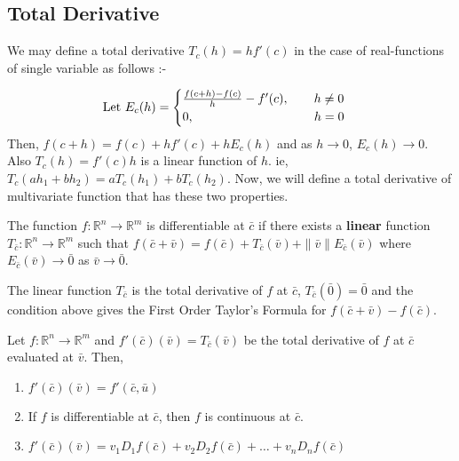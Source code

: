 \subsection{Total Derivative}
We may define a total derivative \( T_c(h) = hf'(c) \) in the case of real-functions of single variable as follows :-

\[ \text{Let }E_c(h) = \begin{cases} \frac{f(c+h)-f(c)}{h} - f'(c),\qquad h \ne 0 \\ 0,\hspace{3.4cm} h = 0 \end{cases} \]
Then, \( f(c+h) = f(c) + hf'(c) + hE_c(h) \) and as \( h \to 0 \), \( E_c(h) \to 0\).
Also \( T_c(h) = f'(c)h \) is a linear function of $h$.
ie, \( T_c(ah_1+bh_2) = aT_c(h_1)+bT_c(h_2) \).
Now, we will define a total derivative of multivariate function that has these two properties.

\begin{definition}
	The function \( f: \mathbb{R}^n \to \mathbb{R}^m \) is differentiable at $\bar{c}$ if there exists a \textbf{linear} function \( T_{\bar{c}} : \mathbb{R}^n \to \mathbb{R}^m \) such that \( f(\bar{c}+\bar{v}) = f(\bar{c}) + T_{\bar{c}}(\bar{v}) + \|\bar{v}\| E_{\bar{c}}(\bar{v}) \) where \( E_{\bar{c}}(\bar{v}) \to \bar{0} \) as \( \bar{v} \to \bar{0} \).
\end{definition}

The linear function $T_{\bar{c}}$ is the total derivative of $f$ at $\bar{c}$, \( T_{\bar{c}}(\bar{0}) = \bar{0} \) and the condition above gives the First Order Taylor's Formula for \( f(\bar{c}+\bar{v})-f(\bar{c}) \).

\begin{remark}[Properties] Let \( f : \mathbb{R}^n \to \mathbb{R}^m \) and \( f'(\bar{c})(\bar{v}) = T_{\bar{c}}(\bar{v}) \) be the total derivative of $f$ at $\bar{c}$ evaluated at $\bar{v}$.
Then, 
\begin{enumerate}
	\item \( f'(\bar{c})(\bar{v}) = f'(\bar{c},\bar{u}) \)
	\item If $f$ is differentiable at $\bar{c}$, then $f$ is continuous at $\bar{c}$.
	\item \( f'(\bar{c})(\bar{v}) = v_1 D_1 f(\bar{c}) + v_2 D_2 f(\bar{c}) + \dots + v_n D_n f(\bar{c}) \)
	\end{enumerate}
\end{remark}

